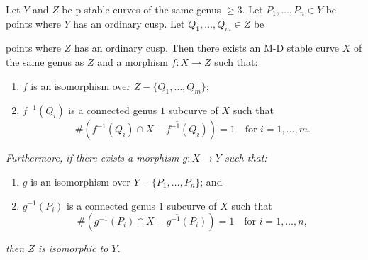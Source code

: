 \documentclass[12pt]{memoir}
\begin{document}
\begin{Lem}\label{lem:4.2}
Let $Y$ and $Z$ be p-stable curves of the same genus $\geqslant 3$. Let $P_1, \dots, P_n \in Y$ be points where $Y$ has an ordinary cusp. Let $Q_1, \dots, Q_m \in Z$ be


points where $Z$ has an ordinary cusp. Then there exists an M-D stable curve $X$ of the same genus as $Z$ and a morphism $f\colon X \to Z$ such that:

\begin{enumerate}[\upshape(i)]
\item $f$ is an isomorphism over $Z - \{Q_1, \dots, Q_m\}$;
\item $f^{-1}(Q_i)$ is a connected genus $1$ subcurve of $X$ such that
\[
\#(f^{-1}(Q_i) \cap \overline{X - f^{-1}(Q_i)}) = 1 \quad \text{for } i = 1, \dots, m.
\]
\end{enumerate}

\noindent\emph{Furthermore, if there exists a morphism $g\colon X \to Y$ such that:}

\begin{enumerate}[\upshape(i)]
\item $g$ is an isomorphism over $Y - \{P_1, \dots, P_n\}$; and
\item $g^{-1}(P_i)$ is a connected genus $1$ subcurve of $X$ such that
\[
\#(g^{-1}(P_i) \cap \overline{X - g^{-1}(P_i)}) = 1 \quad \text{for } i = 1, \dots, n,
\]
\end{enumerate}

\noindent\emph{then $Z$ is isomorphic to $Y$.}
\end{Lem}
\end{document}
